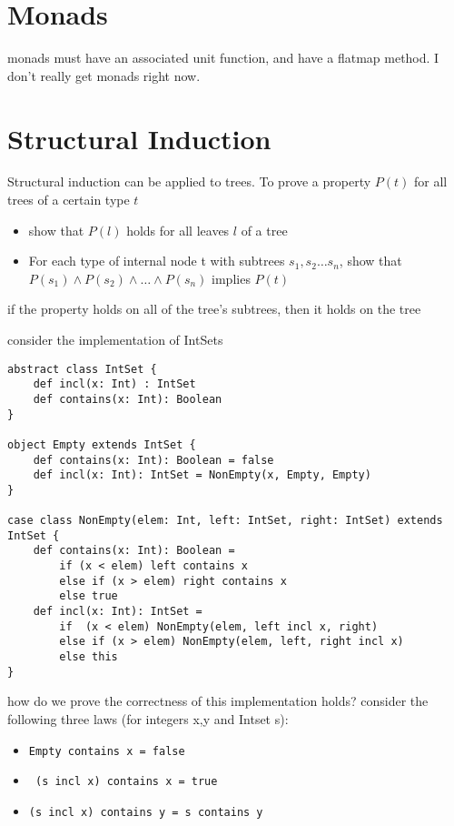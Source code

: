 \section{Monads}

monads must have an associated unit function, and have a flatmap method. I don't really get monads right now.

\section{Structural Induction}

Structural induction can be applied to trees.
To prove a property $P(t)$ for all trees of a certain type $t$
\begin{itemize}
	\item show that $P(l)$ holds for all leaves $l$ of a tree
	\item For each type of internal node t with subtrees $s_1, s_2 \ldots s_n$, show that
	$P(s_1)\wedge P(s_2)\wedge \ldots \wedge P(s_n)$ implies $P(t)$ 
\end{itemize}

if the property holds on all of the tree's subtrees, then it holds on the tree


consider the implementation of IntSets

\begin{lstlisting}
abstract class IntSet {
	def incl(x: Int) : IntSet
	def contains(x: Int): Boolean
}

object Empty extends IntSet {
	def contains(x: Int): Boolean = false
	def incl(x: Int): IntSet = NonEmpty(x, Empty, Empty)
}

case class NonEmpty(elem: Int, left: IntSet, right: IntSet) extends IntSet {
	def contains(x: Int): Boolean = 
		if (x < elem) left contains x
		else if (x > elem) right contains x
		else true
	def incl(x: Int): IntSet = 
		if  (x < elem) NonEmpty(elem, left incl x, right)
		else if (x > elem) NonEmpty(elem, left, right incl x)
		else this
}
\end{lstlisting}

how do we prove the correctness of this implementation holds? 
consider the following three laws (for integers x,y and Intset s):
\begin{itemize}
	\item \lstinline|Empty contains x = false|
	\item \lstinline| (s incl x) contains x = true|
	\item \lstinline|(s incl x) contains y = s contains y|
\end{itemize}

